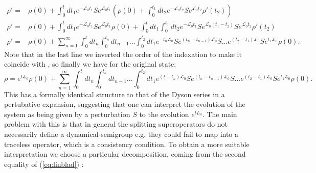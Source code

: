 \begin{align}
\rho' =& \rho(0) +  \int_{0}^{t}dt_{1} e^{-\mathcal{L}_{0}t_{1}}Se^{\mathcal{L}_{0}t_{1}}\left(\rho(0) + \int_{0}^{t_{1}}dt_{2} e^{-\mathcal{L}_{0}t_{2}}Se^{\mathcal{L}_{0}t_{2}}\rho'(t_{2}) \right)\\
  \rho' =& \rho(0) +  \int_{0}^{t}dt_{1} e^{-\mathcal{L}_{0}t_{1}}Se^{\mathcal{L}_{0}t_{1}}\rho(0) + \int_{0}^{t}dt_{1} \int_{0}^{t_{1}}dt_{2}e^{-\mathcal{L}_{0}t_{1}}Se^{\mathcal{L}_{0}(t_{1}-t_{2})}Se^{\mathcal{L}_{0}t_{2}}\rho'(t_{2})\\
  \rho' =& \rho(0) + \sum_{n=1}^{\infty}\int_{0}^{t}dt_{n}\int_{0}^{t_{n}}dt_{n-1}...\int_{0}^{t_{2}}dt_{1}e^{-t_{n}\mathcal{L}_{0}}Se^{(t_{n}-t_{n-1})\mathcal{L}_{0}}S...e^{(t_{2}-t_{1})\mathcal{L}_{0}}Se^{t_{1}\mathcal{L}_{0}}\rho(0).
\end{align}
Note that in the last line we inverted the order of the indexation to make it coincide with \cite{hornberger2009introduction}, so finally
we have for the original state:
\begin{equation}\label{eq:unraveling}
  \rho = e^{t\mathcal{L}_{0}}\rho(0) + \sum_{n=1}^{\infty}\int_{0}^{t}dt_{n}\int_{0}^{t_{n}}dt_{n-1}...\int_{0}^{t_{2}}dt_{1}e^{(t-t_{n})\mathcal{L}_{0}}Se^{(t_{n}-t_{n-1})\mathcal{L}_{0}}S...e^{(t_{2}-t_{1})\mathcal{L}_{0}}Se^{t_{1}\mathcal{L}_{0}}\rho(0).
\end{equation}
This has a formally identical structure to that of the Dyson series in a pertubative expansion, suggesting that one can interpret the evolution
of the system as being given by a perturbation $S$ to the evolution $e^{t{L}_{0}}$. The main problem with this is that in general the splitting
superoperators do not necessarily define a dynamical semigroup e.g. they could fail to map into a traceless operator, which is a consistency
condition. To obtain a more suitable interpretation we choose a particular decomposition, coming from the second equality of (\ref{eq:linblad})
\cite{hornberger2009introduction}:

